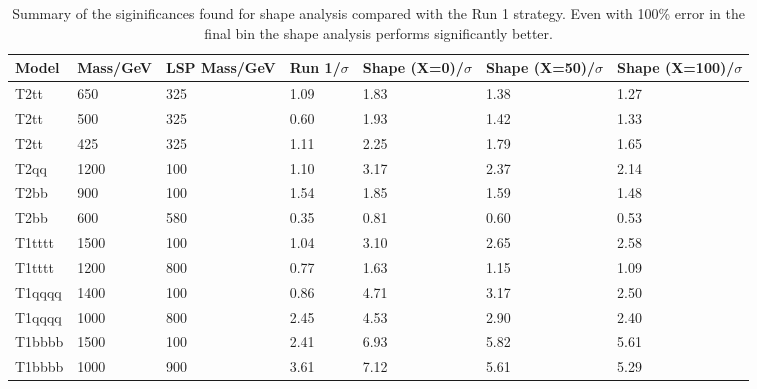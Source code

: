 \begin{table}[!h]
  
  \caption{\label{table:syst} Summary of the siginificances found for shape analysis compared
    with the Run 1 strategy. Even with 100\% error in the final bin
  the shape analysis performs significantly better.}
  \centering
  \footnotesize
  \begin{tabular}{ l | l | l | l | l | l | l }
    Model & Mass/GeV & LSP Mass/GeV & Run 1/$\sigma$ & Shape (X=0)/$\sigma$ & Shape (X=50)/$\sigma$ & Shape (X=100)/$\sigma$ \\ \hline
    T2tt & 650 & 325      & 1.09& 1.83& 1.38& 1.27\\ 
    T2tt & 500 & 325      & 0.60& 1.93& 1.42& 1.33\\ 
    T2tt & 425 & 325      & 1.11& 2.25& 1.79& 1.65\\ 
    T2qq & 1200 & 100      & 1.10& 3.17& 2.37& 2.14\\
    T2bb & 900 & 100      & 1.54& 1.85& 1.59& 1.48\\ 
    T2bb & 600 & 580      & 0.35& 0.81& 0.60& 0.53\\ 
    T1tttt & 1500 & 100    & 1.04& 3.10& 2.65& 2.58\\
    T1tttt & 1200 & 800    & 0.77& 1.63& 1.15& 1.09\\
    T1qqqq & 1400 & 100    & 0.86& 4.71& 3.17& 2.50\\
    T1qqqq & 1000 & 800    & 2.45& 4.53& 2.90& 2.40\\
    T1bbbb & 1500 & 100    & 2.41& 6.93& 5.82& 5.61\\
    T1bbbb & 1000 & 900    & 3.61& 7.12& 5.61& 5.29\\
  \end{tabular}
\end{table}


